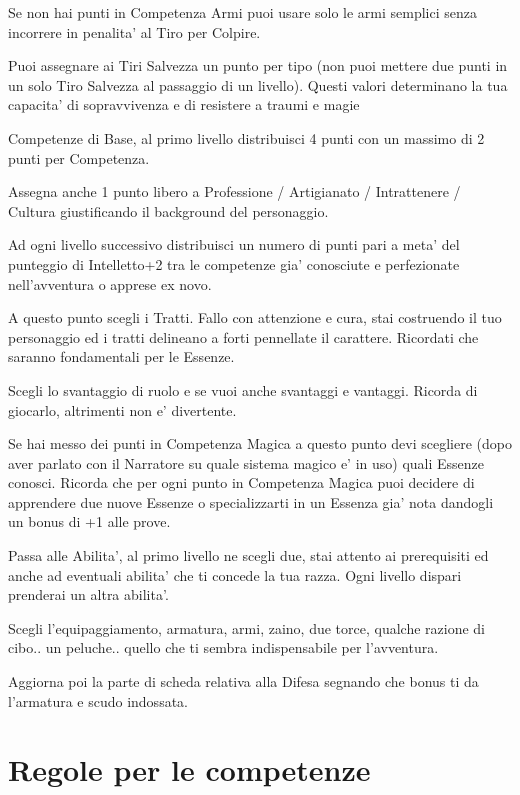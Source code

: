 \documentclass[a4paper,11pt,twoside,openany]{book}
\begin{document}
	Se non hai punti in Competenza Armi puoi usare solo le armi semplici senza incorrere in penalita' al Tiro per Colpire.
	
	Puoi assegnare ai Tiri Salvezza un punto per tipo (non puoi mettere due punti in un solo Tiro Salvezza al passaggio di un livello). Questi valori determinano la tua capacita' di sopravvivenza e di resistere a traumi e magie
	
	Competenze di Base, al primo livello distribuisci 4 punti con un massimo di 2 punti per Competenza.
	
	Assegna anche 1 punto libero a Professione / Artigianato / Intrattenere / Cultura giustificando il background del personaggio.
	
	Ad ogni livello successivo distribuisci un numero di punti pari a meta' del punteggio di Intelletto+2 tra le competenze gia' conosciute e perfezionate nell'avventura o apprese ex novo.
	
	A questo punto scegli i Tratti. Fallo con attenzione e cura, stai costruendo il tuo personaggio ed i tratti delineano a forti pennellate il carattere. Ricordati che saranno fondamentali per le Essenze.
	
	Scegli lo svantaggio di ruolo e se vuoi anche svantaggi e vantaggi. Ricorda di giocarlo, altrimenti non e' divertente.
	
	Se hai messo dei punti in Competenza Magica a questo punto devi scegliere (dopo aver parlato con il Narratore su quale sistema magico e' in uso) quali Essenze conosci. Ricorda che per ogni punto in Competenza Magica puoi decidere di apprendere due nuove Essenze o specializzarti in un Essenza gia' nota dandogli un bonus di +1 alle prove.
	
	Passa alle Abilita', al primo livello ne scegli due, stai attento ai prerequisiti ed anche ad eventuali abilita' che ti concede la tua razza. Ogni livello dispari prenderai un altra abilita'.
	
	Scegli l'equipaggiamento, armatura, armi, zaino, due torce, qualche razione di cibo.. un peluche.. quello che ti sembra indispensabile per l'avventura.
	
	Aggiorna poi la parte di scheda relativa alla Difesa segnando che bonus ti da l'armatura e scudo indossata.
	
	
	
	\pagebreak
	
	\section{Regole per le competenze}
	
\end{document}
